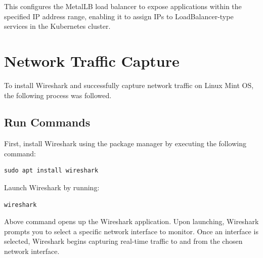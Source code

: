 This configures the MetalLB load balancer to expose applications within the specified IP address range, enabling it to assign IPs to LoadBalancer-type services in the Kubernetes cluster.




\section{Network Traffic Capture}
To install Wireshark and successfully capture network traffic on Linux Mint OS, the following process was followed.

\subsection{Run Commands}
First, install Wireshark using the package manager by executing the following command:

\begin{lstlisting}[breaklines=true,basicstyle=\small\ttfamily,frame=single]
sudo apt install wireshark
\end{lstlisting}

Launch Wireshark by running:

\begin{lstlisting}[breaklines=true,basicstyle=\small\ttfamily,frame=single]
wireshark
\end{lstlisting}

Above command opens up the Wireshark application. Upon launching, Wireshark prompts you to select a specific network interface to monitor. Once an interface is selected, Wireshark begins capturing real-time traffic to and from the chosen network interface.



